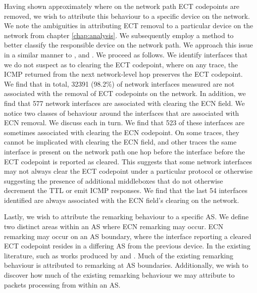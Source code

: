 \documentclass{l4proj}
\begin{document}
Having shown approximately where on the network path ECT codepoints are removed, we wish to attribute this behaviour to a specific device on the network. We note the ambiguities in attributing ECT removal to a particular device on the network from chapter \ref{chap:analysis}. We subsequently employ a method to better classify the responsible device on the network path. We approach this issue in a similar manner to \cite{mcquistin_is_2015}, and \cite{bauer_measuring_2011}. We proceed as follows. We identify interfaces that we do not suspect as to clearing the ECT codepoint, where on any trace, the ICMP returned from the next network-level hop preserves the ECT codepoint. We find that in total, 32391 (98.2\%) of network interfaces measured are not associated with the removal of ECT codepoints on the network. In addition, we find that 577 network interfaces are associated with clearing the ECN field. We notice two classes of behaviour around the interfaces that are associated with ECN removal. We discuss each in turn. We find that 523 of these interfaces are sometimes associated with clearing the ECN codepoint. On some traces, they cannot be implicated with clearing the ECN field, and other traces the same interface is present on the network path one hop before the interface before the ECT codepoint is reported as cleared. This suggests that some network interfaces may not always clear the ECT codepoint under a particular protocol or otherwise suggesting the presence of additional middleboxes that do not otherwise decrement the TTL or emit ICMP responses. We find that the last 54 interfaces identified are always associated with the ECN field's clearing on the network.

Lastly, we wish to attribute the remarking behaviour to a specific AS. We define two distinct areas within an AS where ECN remarking may occur. ECN remarking may occur on an AS boundary, where the interface reporting a cleared ECT codepoint resides in a differing AS from the previous device. In the existing literature, such as works produced by \cite{mcquistin_is_2015} and \cite{bauer_measuring_2011}. Much of the existing remarking behaviour is attributed to remarking at AS boundaries.
Additionally, we wish to discover how much of the existing remarking behaviour we may attribute to packets processing from within an AS.
\end{document}
